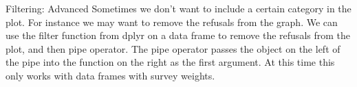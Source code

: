 \documentclass{beamer}\usepackage[]{graphicx}\usepackage[]{color}
\makeatletter
\newcommand{\hlstr}[1]{\textcolor[rgb]{0.192,0.494,0.8}{#1}}%
\newcommand{\hlopt}[1]{\textcolor[rgb]{0,0,0}{#1}}%
\newcommand{\hlstd}[1]{\textcolor[rgb]{0.345,0.345,0.345}{#1}}%
\newcommand{\hlkwd}[1]{\textcolor[rgb]{0.737,0.353,0.396}{\textbf{#1}}}%
\newenvironment{kframe}{%
 \def\at@end@of@kframe{}%
 \ifinner\ifhmode%
  \def\at@end@of@kframe{\end{minipage}}%
  \begin{minipage}{\columnwidth}%
 \fi\fi%
 \def\FrameCommand##1{\hskip\@totalleftmargin \hskip-\fboxsep
 \colorbox{shadecolor}{##1}\hskip-\fboxsep
     \hskip-\linewidth \hskip-\@totalleftmargin \hskip\columnwidth}%
 \MakeFramed {\advance\hsize-\width
   \@totalleftmargin\z@ \linewidth\hsize
   \@setminipage}}%
 {\par\unskip\endMakeFramed%
 \at@end@of@kframe}
\newenvironment{knitrout}{}{} %
\makeatother
\begin{document}
\begin{frame}{Filtering: Advanced}
Sometimes we don't want to include a certain category in the plot.  For instance we may want to remove the refusals from the graph. We can use the filter  function from dplyr on a data frame to remove the refusals from the plot, and then pipe operator. The pipe operator passes the object on the left of the pipe into the function on the right as the first argument. At this time this only works with data frames with survey weights.
\end{frame}

\end{document}
